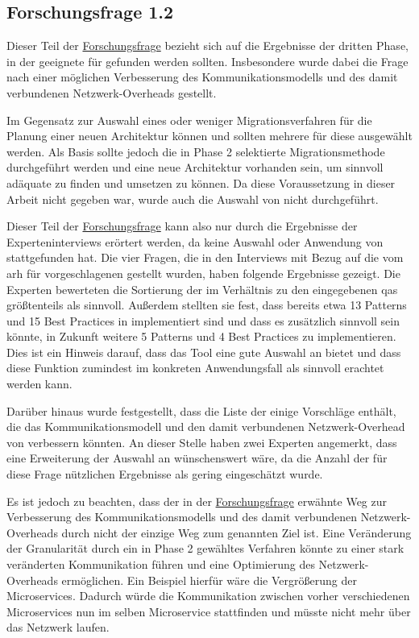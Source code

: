 \subsection{Forschungsfrage 1.2}

Dieser Teil der \hyperref[forschungsfrage:1]{Forschungsfrage} bezieht sich auf die Ergebnisse der dritten Phase, in der geeignete \bpp für \jf gefunden werden sollten.
Insbesondere wurde dabei die Frage nach einer möglichen Verbesserung des Kommunikationsmodells und des damit verbundenen Netzwerk-Overheads gestellt.

Im Gegensatz zur Auswahl eines oder weniger Migrationsverfahren für die Planung einer neuen Architektur können und sollten mehrere \bpp für diese ausgewählt werden.
Als Basis sollte jedoch die in Phase 2 selektierte Migrationsmethode durchgeführt werden und eine neue Architektur vorhanden sein, um sinnvoll adäquate \bpp zu finden und umsetzen zu können.
Da diese Voraussetzung in dieser Arbeit nicht gegeben war, wurde auch die Auswahl von \bpp nicht durchgeführt.

Dieser Teil der  \hyperref[forschungsfrage:1]{Forschungsfrage} kann also nur durch die Ergebnisse der Experteninterviews erörtert werden, da keine Auswahl oder Anwendung von \bpp stattgefunden hat.
Die vier Fragen, die in den Interviews mit Bezug auf die vom \gls{arh} für \jf vorgeschlagenen \bpp gestellt wurden, haben folgende Ergebnisse gezeigt.
Die Experten bewerteten die Sortierung der \bpp im Verhältnis zu den eingegebenen \glspl{qa} größtenteils als sinnvoll.
Außerdem stellten sie fest, dass bereits etwa 13 Patterns und 15 Best Practices in \jf implementiert sind und dass es zusätzlich sinnvoll sein könnte, in Zukunft weitere 5 Patterns und 4 Best Practices zu implementieren.
Dies ist ein Hinweis darauf, dass das Tool eine gute Auswahl an \bpp bietet und dass diese Funktion zumindest im konkreten Anwendungsfall als sinnvoll erachtet werden kann.

Darüber hinaus wurde festgestellt, dass die Liste der \bpp einige Vorschläge enthält, die das Kommunikationsmodell und den damit verbundenen Netzwerk-Overhead von \jf verbessern könnten.
An dieser Stelle haben zwei Experten angemerkt, dass eine Erweiterung der Auswahl an \bpp wünschenswert wäre, da die Anzahl der für diese Frage nützlichen Ergebnisse als gering eingeschätzt wurde.

Es ist jedoch zu beachten, dass der in der \hyperref[forschungsfrage:1]{Forschungsfrage} erwähnte Weg zur Verbesserung des Kommunikationsmodells und des damit verbundenen Netzwerk-Overheads durch \bpp nicht der einzige Weg zum genannten Ziel ist.
Eine Veränderung der Granularität durch ein in Phase 2 gewähltes Verfahren könnte zu einer stark veränderten Kommunikation führen und eine Optimierung des Netzwerk-Overheads ermöglichen.
Ein Beispiel hierfür wäre die Vergrößerung der Microservices.
Dadurch würde die Kommunikation zwischen vorher verschiedenen Microservices nun im selben Microservice stattfinden und müsste nicht mehr über das Netzwerk laufen.

